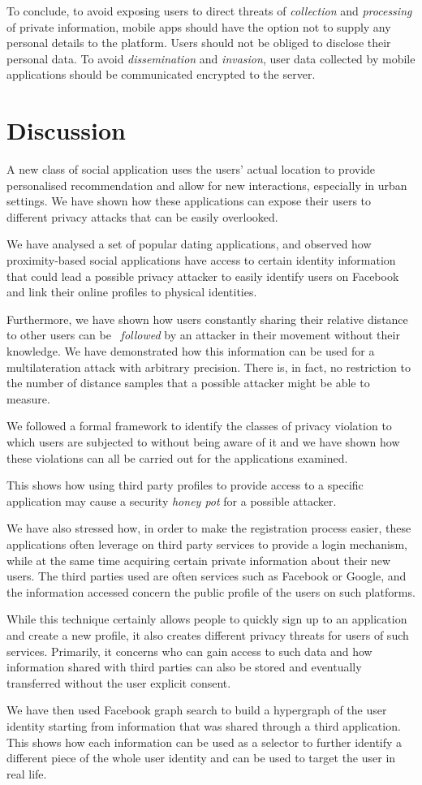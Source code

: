 To conclude, to avoid exposing users to direct threats of \emph{collection} and \emph{processing} of private information, mobile apps should have the option not to supply any personal details to the platform. Users should not be obliged to disclose their personal data. To avoid \emph{dissemination} and \emph{invasion}, user data collected by mobile applications should be communicated encrypted to the server.

\section{Discussion}
\noindent
A new class of social application uses the users' actual location to provide personalised recommendation and allow for new interactions, especially in urban settings. We have shown how these applications can expose their users to different privacy attacks that can be easily overlooked.

We have analysed a set of popular dating applications, and observed how proximity-based social applications have access to certain identity information that could lead a possible privacy attacker to easily identify users on Facebook and link their online profiles to physical identities.

Furthermore, we have shown how users constantly sharing their relative distance to other users can be ~\emph{followed} by an attacker in their movement without their knowledge. We have demonstrated how this information can be used for a multilateration attack with arbitrary precision. There is, in fact, no restriction to the number of distance samples that a possible attacker might be able to measure.

We followed a formal framework to identify the classes of privacy violation to which users are subjected to without being aware of it and we have shown how these violations can all be carried out for the applications examined.

This shows how using third party profiles to provide access to a specific application may cause a security \emph{honey pot} for a possible attacker.

We have also stressed how, in order to make the registration process easier, these applications often leverage on third party services to provide a login mechanism, while at the same time acquiring certain private information about their new users. The third parties used are often services such as Facebook or Google, and the information accessed concern the public profile of the users on such platforms.

While this technique certainly allows people to quickly sign up to an application and create a new profile, it also creates different privacy threats for users of such services. Primarily, it concerns who can gain access to such data and how information shared with third parties can also be stored and eventually transferred without the user explicit consent.

We have then used Facebook graph search to build a hypergraph of the user identity starting from information that was shared through a third application. This shows how each information can be used as a selector to further identify a different piece of the whole user identity and can be used to target the user in real life.